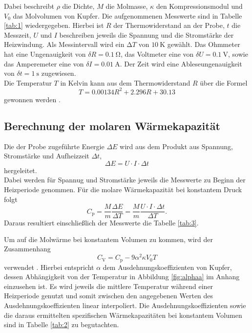 Dabei beschreibt $\rho$ die Dichte, $M$ die Molmasse, $\kappa$ den Kompressionsmodul und $V_0$ das Molvolumen von Kupfer.
Die aufgenommenen Messwerte sind in Tabelle \ref{tab:1} wiedergegeben.
Hierbei ist $R$ der Thermowiderstand an der Probe, $t$ die Messzeit, $U$ und $I$ beschreiben jeweils die Spannung und die Stromstärke der Heizwindung.
Als Messintervall wird ein $\increment T$ von $\SI{10}{\kelvin}$ gewählt.
Das Ohmmeter hat eine Ungenauigkeit von $\delta R = \SI{0.1}{\ohm}$, das Voltmeter eine von $\delta U = \SI{0.1}{\volt}$, sowie das Amperemeter eine von $\delta I = \SI{0.01}{\ampere}$.
Der Zeit wird eine Ableseungenauigkeit von $\delta t = \SI{1}{\second}$ zugewiesen.\\
Die Temperatur $T$ in Kelvin kann aus dem Thermowiderstand $R$ über die Formel
\begin{equation}
  T = 0.00134R^2+2.296R+30.13
\end{equation}
gewonnen werden \cite{skript}.


\newpage

\subsection{Berechnung der molaren Wärmekapazität}
Die der Probe zugeführte Energie $\Delta E$ wird aus dem Produkt aus Spannung, Stromstärke und Aufheizzeit $\Delta t$,
\begin{equation}
  \Delta E =  U\cdot I\cdot \Delta t
\end{equation}
hergeleitet.\\
Dabei werden für Spannug und Stromstärke jeweils die Messwerte zu Beginn der Heizperiode genommen.
Für die molare Wärmekapazität bei konstantem Druck folgt
\begin{equation}
  C_{\text{p}} = \frac{M}{m}\frac{\Delta E}{\Delta T} = \frac{M}{m}\frac{U\cdot I\cdot \Delta t}{\Delta T}.
\end{equation}
Daraus resultiert einschließlich der Messwerte die Tabelle \ref{tab:3}.



Um auf die Molwärme bei konstantem Volumen zu kommen, wird der Zusammenhang
\begin{equation}
  C_{\text{V}} = C_{\text{p}} - 9 \alpha^2 \kappa V_0 T
\end{equation}
verwendet \cite{skript}.
Hierbei entspricht $\alpha$ dem Ausdehnungskoeffizienten von Kupfer, dessen Abhängigkeit von der Temperatur in Abbildung \ref{fig:alphaa} im Anhang einzusehen ist.
Es wird jeweils die mittlere Temperatur während einer Heizperiode genutzt und somit zwischen den angegebenen Werten des Ausdehnungskoeffizienten linear interpoliert.
Die Ausdehnungskoeffizienten sowie die daraus ermittelten spezifischen Wärmekapazitäten bei konstantem Volumen sind in Tabelle \ref{tab:2} zu begutachten.

